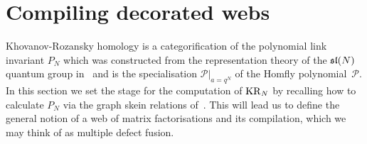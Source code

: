 \documentclass{compositio}
\theoremstyle{definition}
\numberwithin{equation}{section}
\begin{document}
\section{Compiling decorated webs}
\label{compilewebs}

Khovanov-Rozansky homology is a categorification of the polynomial link invariant $P_{N}$ which was constructed from the representation theory of the $\mathfrak{sl}(N)$ quantum group in~\cite{RT1990} and is the specialisation $\mathcal P|_{{a=q^N}}$ of the Homfly polynomial~$\mathcal P$. In this section we set the stage for the computation of $\operatorname{KR}_{N}$ by recalling how to calculate $P_{N}$ via the graph skein relations of~\cite{moy1998}. This will lead us to define the general notion of a web of matrix factorisations and its compilation, which we may think of as multiple defect fusion. 
\end{document}
